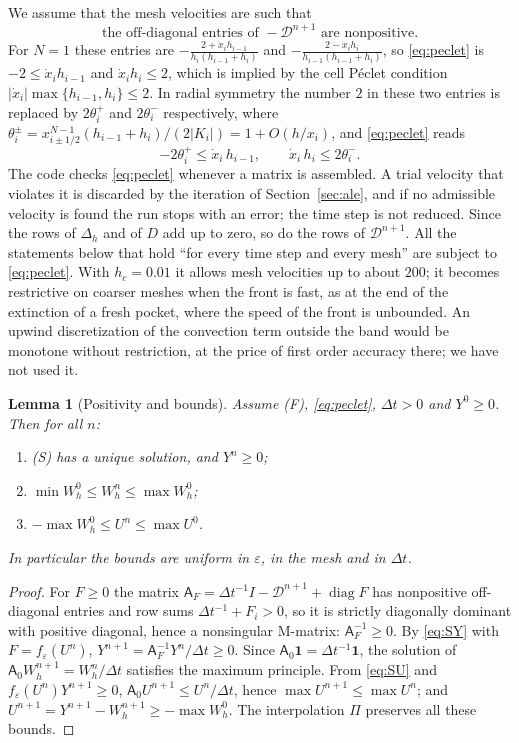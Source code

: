 \documentclass[11pt]{amsart}
\newtheorem{lemma}[theorem]{Lemma}
\theoremstyle{definition}
\theoremstyle{remark}
\newcommand{\ve}{\varepsilon}
\begin{document}
We assume that the mesh velocities are such that
\begin{equation}\label{eq:peclet}
\text{the off-diagonal entries of }-\mathcal D^{n+1}\text{ are nonpositive.}
\end{equation}
For $N=1$ these entries are
$-\frac{2+\dot x_ih_{i-1}}{h_i(h_{i-1}+h_i)}$ and $-\frac{2-\dot x_ih_i}{h_{i-1}(h_{i-1}+h_i)}$, so
\eqref{eq:peclet} is $-2\le\dot x_ih_{i-1}$ and $\dot x_ih_i\le2$, which is implied by the
cell P\'eclet condition $|\dot x_i|\max\{h_{i-1},h_i\}\le2$. In
radial symmetry the number $2$ in these two entries is replaced by $2\theta_i^+$ and
$2\theta_i^-$ respectively, where
$\theta_i^\pm=x_{i\pm1/2}^{N-1}(h_{i-1}+h_i)/(2|K_i|)=1+O(h/x_i)$, and \eqref{eq:peclet} reads
\[
-2\theta_i^+\le\dot x_i\,h_{i-1},\qquad \dot x_i\,h_i\le2\theta_i^- .
\]
The code checks \eqref{eq:peclet} whenever a matrix is assembled. A trial velocity that
violates it is discarded by the iteration of Section~\ref{sec:ale}, and if no admissible
velocity is found the run stops with an error; the time step is not reduced.
Since the rows of $\Delta_h$ and of $D$ add up to zero,
so do the rows of $\mathcal D^{n+1}$. All the statements below that hold ``for every time
step and every mesh'' are subject to \eqref{eq:peclet}. With $h_c=0.01$ it allows mesh
velocities up to about $200$; it becomes restrictive on coarser meshes when the front is
fast, as at the end of the extinction of a fresh pocket, where the speed of the front is
unbounded. An upwind discretization of the convection term outside the band would be
monotone without restriction, at the price of first order accuracy there; we have not
used it.

\begin{lemma}[Positivity and bounds]\label{lem:bounds}
Assume (F), \eqref{eq:peclet}, $\Delta t>0$ and $Y^0\ge0$. Then for all $n$:
\begin{enumerate}
\item (S) has a unique solution, and $Y^n\ge0$;
\item $\min W_h^0\le W_h^n\le\max W_h^0$;
\item $-\max W_h^0\le U^n\le\max U^0$.
\end{enumerate}
In particular the bounds are uniform in $\ve$, in the mesh and in $\Delta t$.
\end{lemma}

\begin{proof}
For $F\ge0$ the matrix $\mathsf A_F=\Delta t^{-1}I-\mathcal D^{n+1}+\operatorname{diag}F$
has nonpositive off-diagonal entries and row sums $\Delta t^{-1}+F_i>0$, so it is
strictly diagonally dominant with positive diagonal, hence a nonsingular
M-matrix: $\mathsf A_F^{-1}\ge0$. By \eqref{eq:SY} with $F=f_\ve(U^n)$,
$Y^{n+1}=\mathsf A_F^{-1}Y^n/\Delta t\ge0$. Since $\mathsf A_0\mathbf 1=\Delta t^{-1}\mathbf 1$, the solution of
$\mathsf A_0W_h^{n+1}=W_h^n/\Delta t$ satisfies the maximum principle. From \eqref{eq:SU} and
$f_\ve(U^n)Y^{n+1}\ge0$, $\mathsf A_0U^{n+1}\le U^n/\Delta t$, hence $\max U^{n+1}\le\max U^n$;
and $U^{n+1}=Y^{n+1}-W_h^{n+1}\ge-\max W_h^0$. The interpolation $\Pi$ preserves all
these bounds.
\end{proof}
\end{document}
